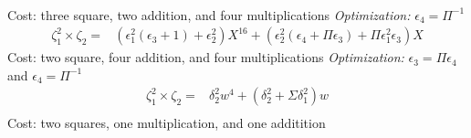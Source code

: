 \begin{itemize}
\begin{align*}
	\end{align*}
	Cost: three square, two addition, and four multiplications
	\emph{Optimization:} $\epsilon_4 = \Pi^{-1}$
	\begin{align*}
	\zeta_1^2 \times \zeta_2 = & (\epsilon_1^2(\epsilon_3 + 1) + \epsilon_2^2) X^{16} + (\epsilon_2^2(\epsilon_4 + \Pi\epsilon_3) + \Pi\epsilon_1^2\epsilon_3) X
	\end{align*}
	Cost: two square, four addition, and four multiplications  %
	\emph{Optimization:} $\epsilon_3 = \Pi\epsilon_4$ and $\epsilon_4 = \Pi^{-1}$
	\begin{align*}
	\zeta_1^2 \times \zeta_2 = & \delta_2^2 w^4 + (\delta_2^2 + \Sigma\delta_1^2) w \\
	\end{align*}
	Cost: two squares, one multiplication, and one additition
\end{itemize}

